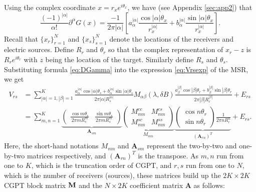 Using the complex coordinate $x = r_x e^{i\theta_x}$, we have (see
Appendix \ref{sec:app2}) that
\begin{equation}
\frac{(-1)^{|\alpha|}}{\alpha!} \partial^{\alpha} G(x) =
\frac{-1}{2\pi |\alpha|} \left[ a^{|\alpha|}_\alpha \frac{\cos
|\alpha| \theta_x}{r^{|\alpha|}_x}  + b^{|\alpha|}_\alpha
\frac{\sin |\alpha| \theta_x}{r^{|\alpha|}_x} \right].
\label{eq:DGamma}
\end{equation}
Recall that $\{x_r\}_{r=1}^N$ and $\{x_s\}_{s=1}^N$ denote the
locations of the receivers and electric sources. Define $R_r$ and
$\theta_r$ so that the complex representation of $x_r - z$ is $R_r
e^{i\theta_r}$ with $z$ being the location of the target.
Similarly define $R_s$ and $\theta_s$. Substituting formula
\eqref{eq:DGamma} into the expression \eqref{eq:Vrsexp} of the
MSR, we get
\begin{equation}
\begin{aligned}
V_{rs} &= \sum_{|\alpha|= 1, |\beta|=1}^{K}
\frac{a^{|\alpha|}_\alpha \cos |\alpha| \theta_s +
b^{|\alpha|}_\alpha \sin |\alpha| \theta_s}{2\pi |\alpha|
R_s^{|\alpha|}}
 M_{\alpha \beta} (\lambda, \delta B) \frac{a^{|\beta|}_\beta \cos |\beta| \theta_r + b^{|\beta|}_\beta \sin |\beta| \theta_r}{2\pi |\beta| R_r^{|\beta|}} + E_{rs}\\
&= \sum_{m,n=1}^K \underbrace{
\begin{pmatrix} \displaystyle
\frac{\cos m\theta_s}{2\pi m R_s^m} & \displaystyle \frac{\sin
m\theta_s}{2\pi m R_s^m} \end{pmatrix}}_{\mathbf{A}_{sm}}
\underbrace{\begin{pmatrix}
M^{cc}_{mn} & M^{cs}_{mn} \\
M^{sc}_{mn} & M^{ss}_{mn}
\end{pmatrix}}_{M_{mn}}
\underbrace{\begin{pmatrix}
\cos n\theta_r \\
\sin n\theta_r
\end{pmatrix}
\frac{1}{2\pi n R_r^n}}_{(\mathbf{A}_{rn})^T} + E_{rs}.
\end{aligned}
\label{eq:Vrsform}
\end{equation}
Here, the short-hand notations $M_{mn}$ and $\mathbf{A}_{sm}$
represent the two-by-two and one-by-two  matrices respectively,
and $(\mathbf{A}_{rn})^T$ is the transpose. As $m,n$ run from one
to $K$, which is the truncation order of CGPT, and $r,s$ run from
one to $N$, which is the number of receivers (sources), these
matrices build up the $2K \times 2K$ CGPT block matrix $\mathbf{M}$
and the $N \times 2K$ coefficient matrix $\mathbf{A}$ as follows:
